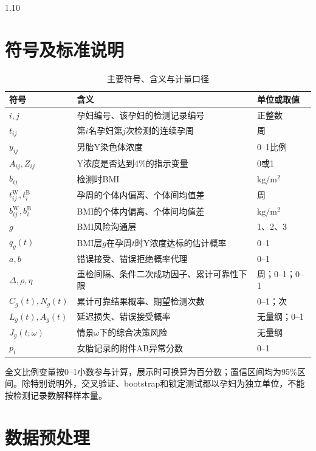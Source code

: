 \documentclass[12pt,a4paper]{ctexrep}
\numberwithin{equation}{section}
\begin{document}
\begin{spacing}{1.10}
{			\section{符号及标准说明}
			\begin{table}[H]
			\centering
			\footnotesize
			\renewcommand{\arraystretch}{1.15}
			\caption{主要符号、含义与计量口径}
			\label{tab:notation}
			\begin{tabularx}{\textwidth}{@{}p{}Xp{}@{}}
			\toprule
			符号 & 含义 & 单位或取值 \\
			\midrule
			$i,j$ & 孕妇编号、该孕妇的检测记录编号 & 正整数 \\
			$t_{ij}$ & 第$i$名孕妇第$j$次检测的连续孕周 & 周 \\
			$y_{ij}$ & 男胎Y染色体浓度 & 0--1比例 \\
			$A_{ij},Z_{ij}$ & Y浓度是否达到4\%的指示变量 & 0或1 \\
			$b_{ij}$ & 检测时BMI & $\mathrm{kg/m^2}$ \\
			$t^{\mathrm W}_{ij},t^{\mathrm B}_i$ & 孕周的个体内偏离、个体间均值差 & 周 \\
			$b^{\mathrm W}_{ij},b^{\mathrm B}_i$ & BMI的个体内偏离、个体间均值差 & $\mathrm{kg/m^2}$ \\
			$g$ & BMI风险沟通层 & 1、2、3 \\
			$q_g(t)$ & BMI层$g$在孕周$t$时Y浓度达标的估计概率 & 0--1 \\
			$a,b$ & 错误接受、错误拒绝概率代理 & 0--1 \\
			$\Delta,\rho,\eta$ & 重检间隔、条件二次成功因子、累计可靠性下限 & 周；0--1；0--1 \\
			$C_g(t),N_g(t)$ & 累计可靠结果概率、期望检测次数 & 0--1；次 \\
			$L_g(t),A_g(t)$ & 延迟损失、错误接受概率 & 无量纲；0--1 \\
			$J_g(t;\omega)$ & 情景$\omega$下的综合决策风险 & 无量纲 \\
			$p_i$ & 女胎记录的附件AB异常分数 & 0--1 \\
			\bottomrule
			\end{tabularx}
			\end{table}

			全文比例变量按0--1小数参与计算，展示时可换算为百分数；置信区间均为95\%区间。除特别说明外，交叉验证、bootstrap和锁定测试都以孕妇为独立单位，不能按检测记录数解释样本量。
			
			\newpage
			\section{数据预处理}
}
\end{spacing}
\end{document}
